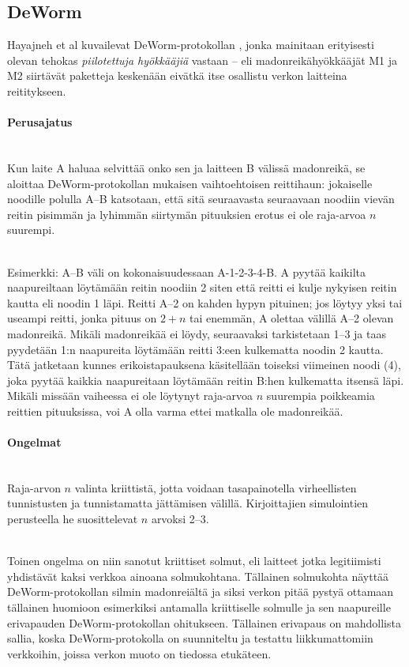 \documentclass[finnish]{tktltiki2}
\theoremstyle{definition}
\theoremstyle{remark}
\begin{document}
\subsection{DeWorm}

Hayajneh et al kuvailevat DeWorm-protokollan \cite{deworm}, jonka mainitaan erityisesti olevan tehokas \emph{piilotettuja hyökkääjiä} vastaan -- eli madonreikähyökkääjät M1 ja M2 siirtävät paketteja keskenään eivätkä itse osallistu verkon laitteina reititykseen.

\paragraph{Perusajatus}
\noindent \\
Kun laite A haluaa selvittää onko sen ja laitteen B välissä madonreikä, se aloittaa DeWorm-protokollan mukaisen vaihtoehtoisen reittihaun: jokaiselle noodille polulla A--B katsotaan, että sitä seuraavasta seuraavaan noodiin vievän reitin pisimmän ja lyhimmän siirtymän pituuksien erotus ei ole raja-arvoa $n$ suurempi. 

\noindent \\
Esimerkki: A--B väli on kokonaisuudessaan A-1-2-3-4-B. A pyytää kaikilta naapureiltaan löytämään reitin noodiin 2 siten että reitti ei kulje nykyisen reitin kautta eli noodin 1 läpi. Reitti A--2 on kahden hypyn pituinen; jos löytyy yksi tai useampi reitti, jonka pituus on $2 + n$ tai enemmän, A olettaa välillä A--2 olevan madonreikä. Mikäli madonreikää ei löydy, seuraavaksi tarkistetaan 1--3 ja taas pyydetään 1:n naapureita löytämään reitti 3:een kulkematta noodin 2 kautta. Tätä jatketaan kunnes erikoistapauksena käsitellään toiseksi viimeinen noodi (4), joka pyytää kaikkia naapureitaan löytämään reitin B:hen kulkematta itsensä läpi. Mikäli missään vaiheessa ei ole löytynyt raja-arvoa $n$ suurempia poikkeamia reittien pituuksissa, voi A olla varma ettei matkalla ole madonreikää.

\paragraph{Ongelmat}
\noindent \\
Raja-arvon $n$ valinta kriittistä, jotta voidaan tasapainotella virheellisten tunnistusten ja tunnistamatta jättämisen välillä. Kirjoittajien simulointien perusteella he suosittelevat $n$ arvoksi 2--3.

\noindent \\
Toinen ongelma on niin sanotut kriittiset solmut, eli laitteet jotka legitiimisti yhdistävät kaksi verkkoa ainoana solmukohtana. Tällainen solmukohta näyttää DeWorm-protokollan silmin madonreiältä ja siksi verkon pitää pystyä ottamaan tällainen huomioon esimerkiksi antamalla kriittiselle solmulle ja sen naapureille erivapauden DeWorm-protokollan ohitukseen. Tällainen erivapaus on mahdollista sallia, koska DeWorm-protokolla on suunniteltu ja testattu liikkumattomiin verkkoihin, joissa verkon muoto on tiedossa etukäteen.
\end{document}
